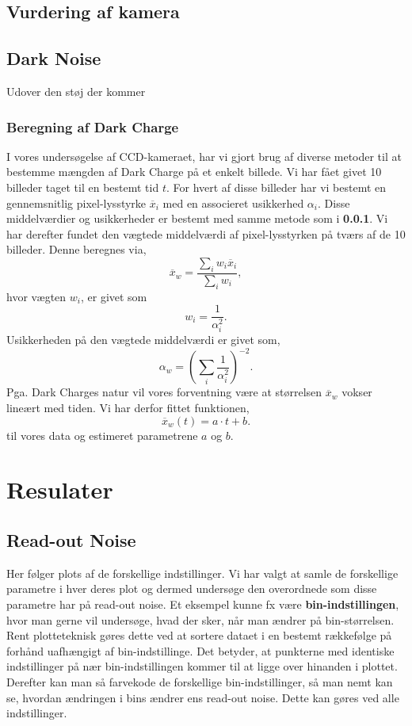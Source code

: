 \documentclass[working]{tuftebook}
\begin{document}
\section{Vurdering af kamera}
\section{Dark Noise}
Udover den støj der kommer
\subsection{Beregning af Dark Charge}
I vores undersøgelse af CCD-kameraet, har vi gjort brug af diverse metoder til at bestemme mængden af Dark Charge på et enkelt billede. Vi har fået givet 10 billeder taget til en bestemt tid $t$. For hvert af disse billeder har vi bestemt en gennemsnitlig pixel-lysstyrke $\overline{x}_i$ med en associeret usikkerhed $\alpha_i $. Disse middelværdier og usikkerheder er bestemt med samme metode som i \textbf{0.0.1}. Vi har derefter fundet den vægtede middelværdi af pixel-lysstyrken på tværs af de 10 billeder. Denne beregnes via,
\[
	\overline{x}_w = \frac{\sum_i w_i\overline{x}_i}{\sum_i w_i} 
,\]
hvor vægten $w_i$, er givet som
 \[
w_i = \frac{1}{\alpha _i^2}
.\]
Usikkerheden på den vægtede middelværdi er givet som,
\[
\alpha_w =\left( \sum_{i} \frac{1}{\alpha _i^2}   \right)^{-2}
.\]
Pga. Dark Charges natur vil vores forventning være at størrelsen $\overline{x}_w$ vokser lineært med tiden. Vi har derfor fittet funktionen,
\[
\overline{x}_w\left( t \right)  = a\cdot t + b
.\]
til vores data og estimeret parametrene $a$ og $b$.
\chapter{Resulater}
\section{Read-out Noise}
Her følger plots af de forskellige indstillinger. Vi har valgt at samle de forskellige parametre i hver deres plot og dermed undersøge den overordnede som disse parametre har på read-out noise.
Et eksempel kunne fx være \textbf{bin-indstillingen}, hvor man gerne vil undersøge, hvad der sker, når man ændrer på bin-størrelsen. Rent plotteteknisk gøres dette ved at sortere dataet i en bestemt rækkefølge på forhånd uafhængigt af bin-indstillinge. Det betyder, at punkterne med identiske indstillinger på nær bin-indstillingen kommer til at ligge over hinanden i plottet. Derefter kan man så farvekode de forskellige bin-indstillinger, så man nemt kan se, hvordan ændringen i bins ændrer ens read-out noise. Dette kan gøres ved alle indstillinger.
\end{document}
